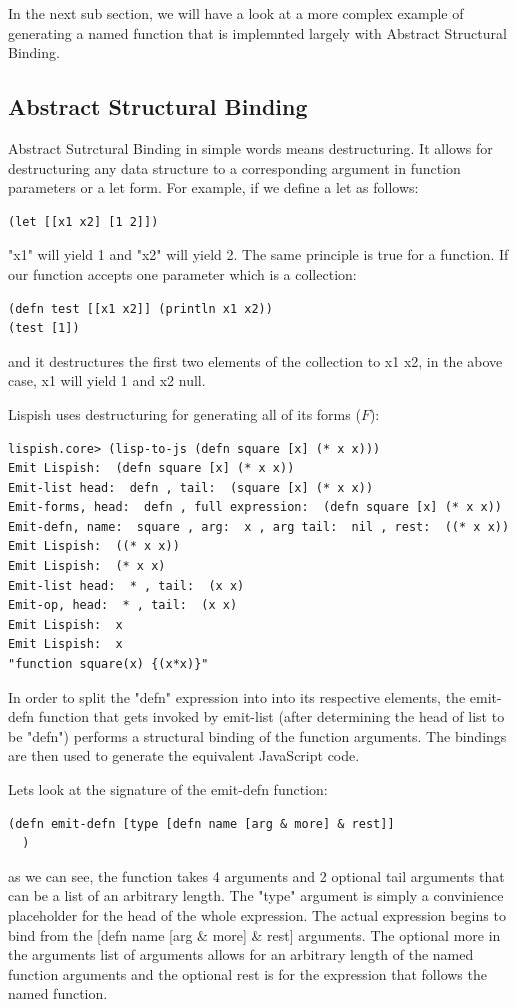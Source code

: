 In the next sub section, we will have a look at a more complex example of generating a named function that is implemnted largely with Abstract Structural Binding.

\subsection{Abstract Structural Binding}
Abstract Sutrctural Binding in simple words means destructuring. It allows for destructuring any data structure to a corresponding argument in function parameters or a let form.
For example, if we define a let as follows:
\begin{verbatim}
(let [[x1 x2] [1 2]])
\end{verbatim}
"x1" will yield 1 and "x2" will yield 2.
The same principle is true for a function.
If our function accepts one parameter which is a collection:

\begin{verbatim}
(defn test [[x1 x2]] (println x1 x2))
(test [1])
\end{verbatim}
and it destructures the first two elements of the collection to x1 x2, in the above case, x1 will yield 1 and x2 null.


Lispish uses destructuring for generating all of its forms ($F$):
\begin{verbatim}
lispish.core> (lisp-to-js (defn square [x] (* x x)))
Emit Lispish:  (defn square [x] (* x x))
Emit-list head:  defn , tail:  (square [x] (* x x))
Emit-forms, head:  defn , full expression:  (defn square [x] (* x x))
Emit-defn, name:  square , arg:  x , arg tail:  nil , rest:  ((* x x))
Emit Lispish:  ((* x x))
Emit Lispish:  (* x x)
Emit-list head:  * , tail:  (x x)
Emit-op, head:  * , tail:  (x x)
Emit Lispish:  x
Emit Lispish:  x
"function square(x) {(x*x)}"
\end{verbatim}

In order to split the "defn" expression into into its respective elements, the emit-defn function that gets invoked by emit-list (after determining the head of list to be "defn") performs a structural binding of the function arguments. The bindings are then used to generate the equivalent JavaScript code. 

Lets look at the signature of the emit-defn function:
\begin{verbatim}
(defn emit-defn [type [defn name [arg & more] & rest]]
  )
\end{verbatim}
as we can see, the function takes 4 arguments and 2 optional tail arguments that can be a list of an arbitrary length. The "type" argument is simply a convinience placeholder for the head of the whole expression.
The actual expression begins to bind from the [defn name [arg \& more] \& rest] arguments. 
The optional more in the arguments list of arguments allows for an arbitrary length of the named function arguments and the optional rest is for the expression that follows the named function.

